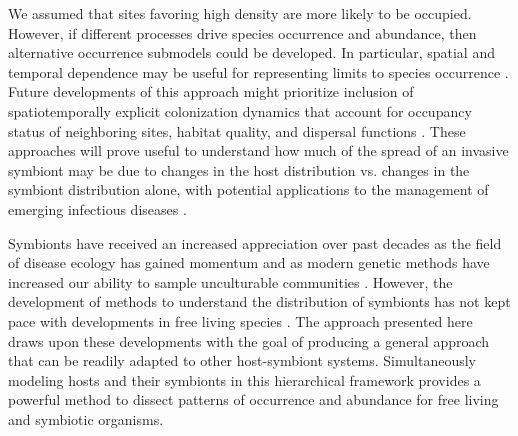 We assumed that sites favoring high density are more likely to be occupied.
However, if different processes drive species occurrence and abundance, then alternative occurrence submodels could be developed.
In particular, spatial and temporal dependence may be useful for representing limits to species occurrence \citep{Holt2000}.
Future developments of this approach might prioritize inclusion of spatiotemporally explicit colonization dynamics that account for occupancy status of neighboring sites, habitat quality, and dispersal functions \citep{Broms2015}.
These approaches will prove useful to understand how much of the spread of an invasive symbiont may be due to changes in the host distribution vs. changes in the symbiont distribution alone, with potential applications to the management of emerging infectious diseases \citep{Mitchell2006}.

Symbionts have received an increased appreciation over past decades as the field of disease ecology has gained momentum and as modern genetic methods have increased our ability to sample unculturable communities \citep{Schrag1995, Riesenfeld2004}.
However, the development of methods to understand the distribution of symbionts has not kept pace with developments in free living species \citep{Bailey2014}.
The approach presented here draws upon these developments with the goal of producing a general approach that can be readily adapted to other host-symbiont systems.
Simultaneously modeling hosts and their symbionts in this hierarchical framework provides a powerful method to dissect patterns of occurrence and abundance for free living and symbiotic organisms.

